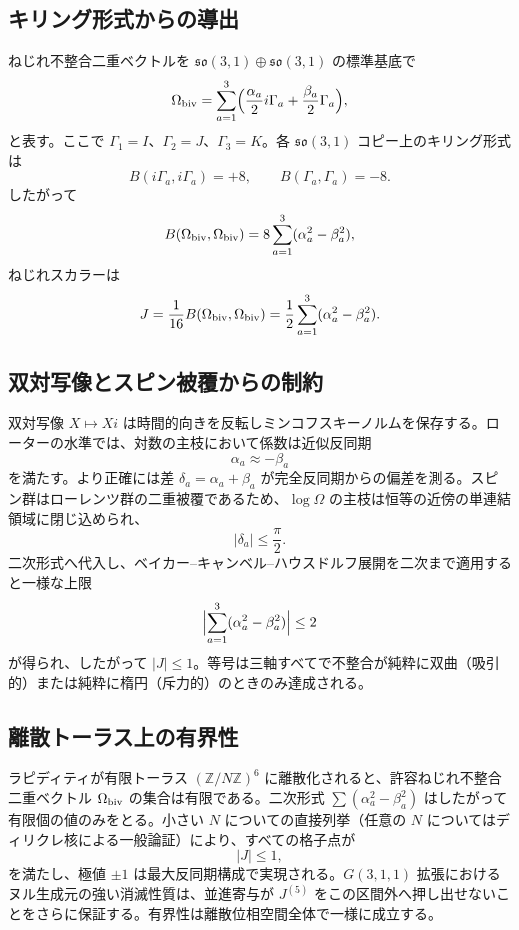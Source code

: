 \documentclass[a4paper]{article}
\theoremstyle{definition}
\begin{document}
\subsection{キリング形式からの導出}

ねじれ不整合二重ベクトルを $\mathfrak{so}(3,1) \oplus \mathfrak{so}(3,1)$ の標準基底で
\[
\Omega_{\rm biv} = \sum_{a=1}^3 \Bigl( \frac{\alpha_a}{2} i\Gamma_a + \frac{\beta_a}{2} \Gamma_a \Bigr),
\]
と表す。ここで $\Gamma_1 = I$、$\Gamma_2 = J$、$\Gamma_3 = K$。各 $\mathfrak{so}(3,1)$ コピー上のキリング形式は
\[
B(i\Gamma_a, i\Gamma_a) = +8, \qquad B(\Gamma_a, \Gamma_a) = -8.
\]
したがって
\[
B(\Omega_{\rm biv}, \Omega_{\rm biv}) = 8 \sum_{a=1}^3 (\alpha_a^2 - \beta_a^2),
\]
ねじれスカラーは
\[
J = \frac{1}{16} B(\Omega_{\rm biv}, \Omega_{\rm biv}) = \frac12 \sum_{a=1}^3 (\alpha_a^2 - \beta_a^2).
\]

\subsection{双対写像とスピン被覆からの制約}

双対写像 $X \mapsto Xi$ は時間的向きを反転しミンコフスキーノルムを保存する。ローターの水準では、対数の主枝において係数は近似反同期
\[
\alpha_a \approx -\beta_a
\]
を満たす。より正確には差 $\delta_a = \alpha_a + \beta_a$ が完全反同期からの偏差を測る。スピン群はローレンツ群の二重被覆であるため、$\log \Omega$ の主枝は恒等の近傍の単連結領域に閉じ込められ、
\[
|\delta_a| \leq \frac{\pi}{2}.
\]
二次形式へ代入し、ベイカー--キャンベル--ハウスドルフ展開を二次まで適用すると一様な上限
\[
\Bigl| \sum_{a=1}^3 (\alpha_a^2 - \beta_a^2) \Bigr| \leq 2
\]
が得られ、したがって $|J| \leq 1$。等号は三軸すべてで不整合が純粋に双曲（吸引的）または純粋に楕円（斥力的）のときのみ達成される。

\subsection{離散トーラス上の有界性}

ラピディティが有限トーラス $(\mathbb{Z}/N\mathbb{Z})^6$ に離散化されると、許容ねじれ不整合二重ベクトル $\Omega_{\rm biv}$ の集合は有限である。二次形式 $\sum (\alpha_a^2 - \beta_a^2)$ はしたがって有限個の値のみをとる。小さい $N$ についての直接列挙（任意の $N$ についてはディリクレ核による一般論証）により、すべての格子点が
\[
|J| \leq 1,
\]
を満たし、極値 $\pm 1$ は最大反同期構成で実現される。$G(3,1,1)$ 拡張におけるヌル生成元の強い消滅性質は、並進寄与が $J^{(5)}$ をこの区間外へ押し出せないことをさらに保証する。有界性は離散位相空間全体で一様に成立する。
\end{document}
